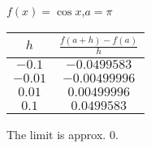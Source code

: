 {$\displaystyle f(x) =\cos x$,\quad  $a=\pi$}
{\begin{tabular}{cc}
$h$ & $\frac{f(a+h)-f(a)}{h}$\\ \hline 
 $-0.1$ & $-0.0499583$ \\
 $-0.01$ & $-0.00499996$ \\
 $0.01$ & $0.00499996$ \\
 $0.1$ & $0.0499583$
\end{tabular}
The limit is approx. 0.
}
